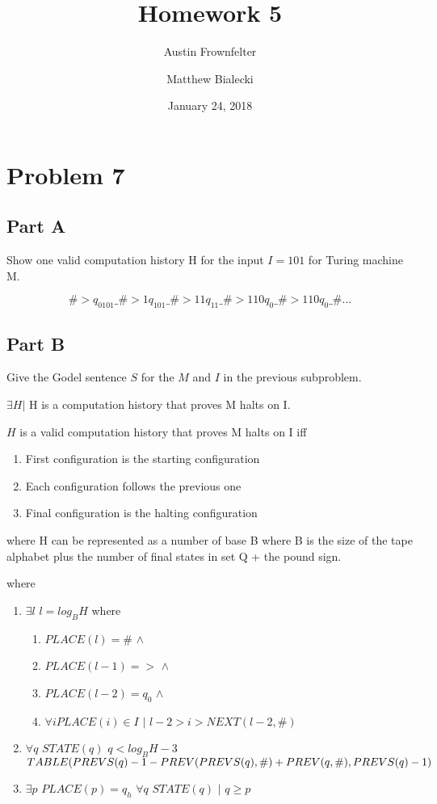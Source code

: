 \documentclass{article}
\title{Homework 5}
\author{Austin Frownfelter \and Matthew Bialecki}
\date{January 24, 2018}
\begin{document}
\maketitle

\section{Problem 7}
\subsection{Part A}
Show one valid computation history H for the input $I=101$ for Turing machine M.

\[ \#>q_0101\_\#>1q_101\_\#>11q_11\_\#>110q_0\_\#>110q_0\_\#... \]

\subsection{Part B}

Give the Godel sentence $S$ for the $M$ and $I$ in the previous subproblem.

$\exists H | $ H is a computation history that proves M halts on I.

\bigskip
$H$ is a valid computation history that proves M halts on I iff
\begin{enumerate}[itemsep=0mm]
\item First configuration is the starting configuration
\item Each configuration follows the previous one
\item Final configuration is the halting configuration
\end{enumerate}

where H can be represented as a number of base B where B is the size of the tape alphabet plus the number of final states in set Q + the pound sign.

where

\begin{enumerate}[label=\arabic*)]
\item $\exists l$ $ l=log_B H$ where
\begin{enumerate}[label=]
\item$PLACE(l)=\# $ $\land $
\item$PLACE(l-1)=> $ $\land $
\item$PLACE(l-2)=q_0 $ $\land $
\item$\forall i PLACE(i)\in I $ $|$ $ l-2>i>NEXT(l-2,\#) $
\end{enumerate}

\item$\forall q$ $STATE(q) $  $ q<log_B H-3$\\
$TABLE(PREVS(q)-1-PREV(PREVS(q),\#)+PREV(q,\#), \\PREVS(q)-1)$

\item$\exists p$ $PLACE(p)=q_h $ $ \forall q $ $STATE(q) $ $|$ $q\geq p$
\end{enumerate}
\end{document}
